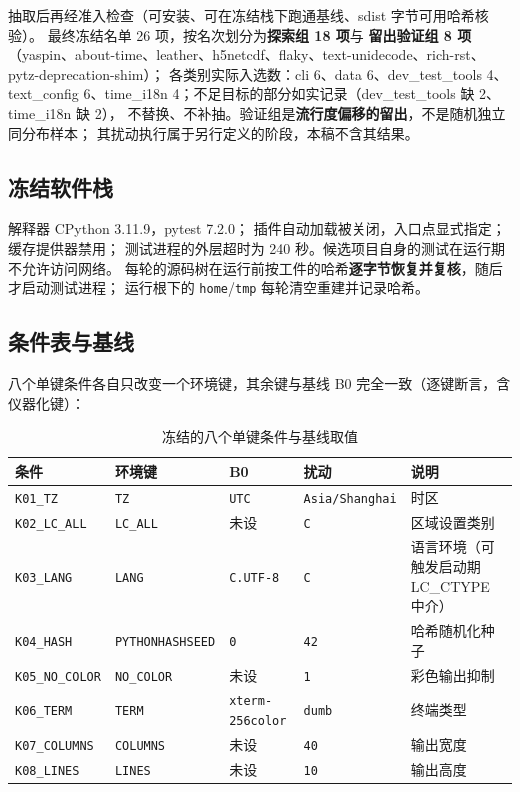 \documentclass[11pt]{ctexart}
\begin{document}
抽取后再经准入检查（可安装、可在冻结栈下跑通基线、sdist 字节可用哈希核验）。
最终冻结名单 26 项，按名次划分为\textbf{探索组 18 项}与
\textbf{留出验证组 8 项}（yaspin、about-time、leather、h5netcdf、flaky、text-unidecode、rich-rst、pytz-deprecation-shim）；
各类别实际入选数：cli 6、data 6、dev\_test\_tools 4、text\_config 6、time\_i18n 4；不足目标的部分如实记录（dev\_test\_tools 缺 2、time\_i18n 缺 2），
不替换、不补抽。验证组是\textbf{流行度偏移的留出}，不是随机独立同分布样本；
其扰动执行属于另行定义的阶段，本稿不含其结果。

\subsection{冻结软件栈}

解释器 CPython 3.11.9，pytest 7.2.0；
插件自动加载被关闭，入口点显式指定；缓存提供器禁用；
测试进程的外层超时为 240 秒。候选项目自身的测试在运行期不允许访问网络。
每轮的源码树在运行前按工件的哈希\textbf{逐字节恢复并复核}，随后才启动测试进程；
运行根下的 \texttt{home}/\texttt{tmp} 每轮清空重建并记录哈希。

\subsection{条件表与基线}

八个单键条件各自只改变一个环境键，其余键与基线 B0 完全一致（逐键断言，含仪器化键）：

\begin{table}[h]
\centering
\caption{冻结的八个单键条件与基线取值}
\small
\begin{tabular}{lllll}
\toprule
条件 & 环境键 & B0 & 扰动 & 说明 \\
\midrule
\texttt{K01\_TZ} & \texttt{TZ} & \texttt{UTC} & \texttt{Asia/Shanghai} & 时区 \\
\texttt{K02\_LC\_ALL} & \texttt{LC\_ALL} & 未设 & \texttt{C} & 区域设置类别 \\
\texttt{K03\_LANG} & \texttt{LANG} & \texttt{C.UTF-8} & \texttt{C} & 语言环境（可触发启动期 LC\_CTYPE 中介） \\
\texttt{K04\_HASH} & \texttt{PYTHONHASHSEED} & \texttt{0} & \texttt{42} & 哈希随机化种子 \\
\texttt{K05\_NO\_COLOR} & \texttt{NO\_COLOR} & 未设 & \texttt{1} & 彩色输出抑制 \\
\texttt{K06\_TERM} & \texttt{TERM} & \texttt{xterm-256color} & \texttt{dumb} & 终端类型 \\
\texttt{K07\_COLUMNS} & \texttt{COLUMNS} & 未设 & \texttt{40} & 输出宽度 \\
\texttt{K08\_LINES} & \texttt{LINES} & 未设 & \texttt{10} & 输出高度 \\
\bottomrule
\end{tabular}
\end{table}
\end{document}
